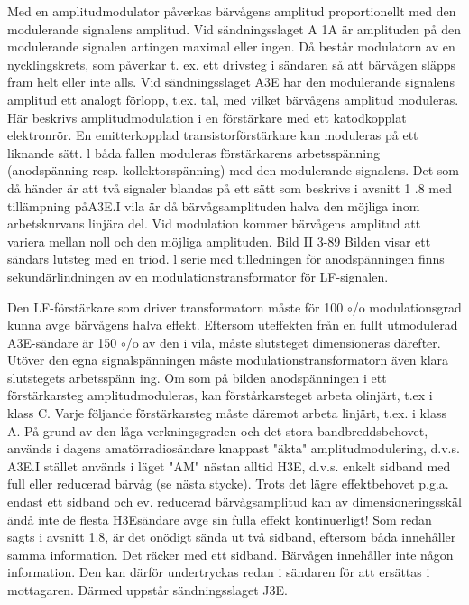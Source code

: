 Med en amplitudmodulator påverkas bärvågens amplitud proportionellt med den modulerande signalens amplitud.
Vid sändningsslaget A 1A är amplituden
på den modulerande signalen antingen maximal eller ingen. Då består modulatorn av en
nycklingskrets, som påverkar t. ex. ett drivsteg i sändaren så att bärvågen släpps fram
helt eller inte alls.
Vid sändningsslaget A3E har den modulerande signalens amplitud ett analogt förlopp, t.ex. tal, med vilket bärvågens amplitud moduleras. Här beskrivs amplitudmodulation i en förstärkare med ett katodkopplat
elektronrör. En emitterkopplad transistorförstärkare kan moduleras på ett liknande
sätt. l båda fallen moduleras förstärkarens
arbetsspänning (anodspänning resp. kollektorspänning) med den modulerande signalens. Det som då händer är att två signaler
blandas på ett sätt som beskrivs i avsnitt 1 .8
med tillämpning påA3E.I vila är då bärvågsamplituden halva den möjliga inom arbetskurvans linjära del. Vid modulation kommer
bärvågens amplitud att variera mellan noll
och den möjliga amplituden.
Bild II 3-89
Bilden visar ett sändars lutsteg med en triod.
l serie med tilledningen för anodspänningen
finns sekundärlindningen av en modulationstransformator för LF-signalen.

Den LF-förstärkare som driver transformatorn måste för 100 \(\circ\)/o modulationsgrad
kunna avge bärvågens halva effekt. Eftersom uteffekten från en fullt utmodulerad
A3E-sändare är 150 \(\circ\)/o av den i vila, måste
slutsteget dimensioneras därefter. Utöver
den egna signalspänningen måste modulationstransformatorn även klara slutstegets
arbetsspänn ing.
Om som på bilden anodspänningen i ett
förstärkarsteg amplitudmoduleras, kan förstårkarsteget arbeta olinjärt, t.ex i klass C.
Varje följande förstärkarsteg måste däremot
arbeta linjärt, t.ex. i klass A.
På grund av den låga verkningsgraden
och det stora bandbreddsbehovet, används
i dagens amatörradiosändare knappast
"äkta" amplitudmodulering, d.v.s. A3E.I stället används i läget "AM" nästan alltid H3E,
d.v.s. enkelt sidband med full eller reducerad bärvåg (se nästa stycke). Trots det lägre
effektbehovet p.g.a. endast ett sidband och
ev. reducerad bärvågsamplitud kan av dimensioneringsskäl ändå inte de flesta H3Esändare avge sin fulla effekt kontinuerligt!
Som redan sagts i avsnitt 1.8, är det onödigt
sända ut två sidband, eftersom båda innehåller samma information. Det räcker med
ett sidband. Bärvågen innehåller inte någon
information. Den kan därför undertryckas
redan i sändaren för att ersättas i mottagaren. Därmed uppstår sändningsslaget J3E.

